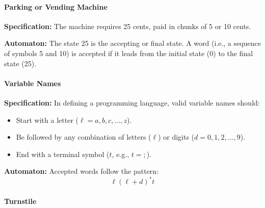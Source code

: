 \documentclass{article}
\theoremstyle{theorem}
\theoremstyle{definition}
\theoremstyle{remark}
\begin{document}
\paragraph*{Parking or Vending Machine}
\textbf{Specification:} The machine requires 25 cents, paid in chunks of 5 or 10 cents.

\textbf{Automaton:} The state 25 is the accepting or final state. A word (i.e., a sequence of symbols 5 and 10) is accepted if it leads from the initial state (0) to the final state (25).

\begin{center}
\end{center}

\paragraph*{Variable Names}

\textbf{Specification:} In defining a programming language, valid variable names should:
\begin{itemize}
    \item Start with a letter (\(\ell = a, b, c, \dots, z\)).
    \item Be followed by any combination of letters (\(\ell\)) or digits (\(d = 0,1,2,\dots,9\)).
    \item End with a terminal symbol (\(t\), e.g., \(t = ;\)).
\end{itemize}

\textbf{Automaton:} Accepted words follow the pattern:
\[
\ell (\ell + d)^* t
\]

\newpage

\paragraph*{Turnstile}
\end{document}
